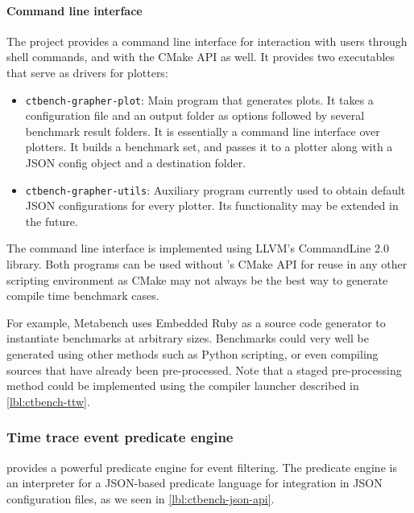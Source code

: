 \documentclass[../../main.tex]{subfiles}
\begin{document}
\paragraph{Command line interface}

The \grapher project provides a command line interface for interaction with
users through shell commands, and with the CMake API as well. It provides two
executables that serve as drivers for \grapher plotters:

\begin{itemize}

\item \lstinline{ctbench-grapher-plot}: Main program that generates plots.
      It takes a configuration file and an output folder as options followed by
      several benchmark result folders.
      It is essentially a command line interface over plotters.
      It builds a benchmark set, and passes it to a plotter along with a JSON
      config object and a destination folder.

\item \lstinline{ctbench-grapher-utils}: Auxiliary program currently used to
      obtain default JSON configurations for every plotter. Its functionality
      may be extended in the future.

\end{itemize}

The command line interface is implemented using LLVM's CommandLine 2.0 library.
Both programs can be used without \ctbench's CMake API for reuse in any other
scripting environment as CMake may not always be the best way to generate \cpp
compile time benchmark cases.

For example, Metabench\cite{metabench} uses Embedded Ruby as a source code
generator to instantiate benchmarks at arbitrary sizes. Benchmarks could very
well be generated using other methods such as Python scripting, or even
compiling \cpp sources that have already been pre-processed. Note that a staged
pre-processing method could be implemented using the compiler launcher described
in \ref{lbl:ctbench-ttw}.

\subsubsection{Time trace event predicate engine}
\label{lbl:grapher-predicate-engine}

\grapher provides a powerful predicate engine for event filtering.
The predicate engine is an interpreter for a JSON-based predicate language for
integration in JSON configuration files, as we seen in
\ref{lbl:ctbench-json-api}.
\end{document}
